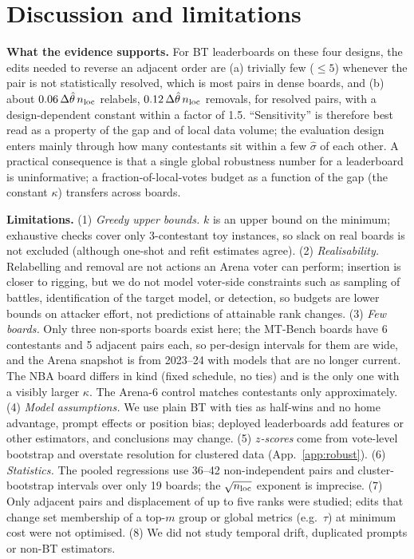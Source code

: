 \documentclass{article}
\newcommand{\nloc}{n_{\rm loc}}
\newcommand{\thh}{\hat\theta}
\begin{document}
\section{Discussion and limitations}
\textbf{What the evidence supports.} For BT leaderboards on these four designs, the edits needed to reverse an adjacent order are (a) trivially few ($\leq5$) whenever the pair is not statistically resolved, which is most pairs in dense boards, and (b) about $0.06\,\Delta\thh\,\nloc$ relabels, $0.12\,\Delta\thh\,\nloc$ removals, for resolved pairs, with a design-dependent constant within a factor of 1.5. ``Sensitivity'' is therefore best read as a property of the gap and of local data volume; the evaluation design enters mainly through how many contestants sit within a few $\hat\sigma$ of each other. A practical consequence is that a single global robustness number for a leaderboard is uninformative; a fraction-of-local-votes budget as a function of the gap (the constant $\kappa$) transfers across boards.

\textbf{Limitations.} (1) \emph{Greedy upper bounds.} $k$ is an upper bound on the minimum; exhaustive checks cover only 3-contestant toy instances, so slack on real boards is not excluded (although one-shot and refit estimates agree). (2) \emph{Realisability.} Relabelling and removal are not actions an Arena voter can perform; insertion is closer to rigging, but we do not model voter-side constraints such as sampling of battles, identification of the target model, or detection, so budgets are lower bounds on attacker effort, not predictions of attainable rank changes. (3) \emph{Few boards.} Only three non-sports boards exist here; the MT-Bench boards have 6 contestants and 5 adjacent pairs each, so per-design intervals for them are wide, and the Arena snapshot is from 2023--24 with models that are no longer current. The NBA board differs in kind (fixed schedule, no ties) and is the only one with a visibly larger $\kappa$. The Arena-6 control matches contestants only approximately. (4) \emph{Model assumptions.} We use plain BT with ties as half-wins and no home advantage, prompt effects or position bias; deployed leaderboards add features or other estimators, and conclusions may change. (5) \emph{$z$-scores} come from vote-level bootstrap and overstate resolution for clustered data (App.~\ref{app:robust}). (6) \emph{Statistics.} The pooled regressions use 36--42 non-independent pairs and cluster-bootstrap intervals over only 19 boards; the $\sqrt{\nloc}$ exponent is imprecise. (7) Only adjacent pairs and displacement of up to five ranks were studied; edits that change set membership of a top-$m$ group or global metrics (e.g.\ $\tau$) at minimum cost were not optimised. (8) We did not study temporal drift, duplicated prompts or non-BT estimators.
\end{document}
